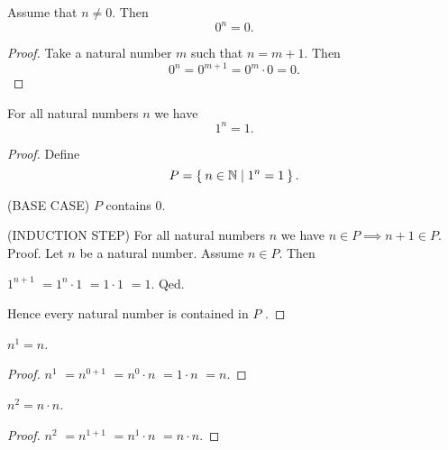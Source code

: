 \documentclass[../../arithmetic.ftl.tex]{subfiles}
\begin{document}
  \begin{forthel}
    \begin{proposition}\label{Arithmetic_01_04_876526}
      Assume that $n \neq 0$.
      Then \[ 0^{n} = 0. \]
    \end{proposition}
    \begin{proof}
      Take a natural number $m$ such that $n = m + 1$.
      Then
      \[
          0^{n}
        = 0^{m + 1}       %
        = 0^{m} \cdot 0   %
        = 0.              %
      \]
    \end{proof}


    \begin{proposition}\label{Arithmetic_01_04_577060}
      For all natural numbers $n$ we have \[ 1^{n} = 1. \]
    \end{proposition}
    \begin{proof}
      Define \[ P = \Set{n \in \mathbb{N} | 1^{n} = 1}. \]

      (BASE CASE) $P$ contains $0$.

      (INDUCTION STEP) For all natural numbers $n$ we have $n \in P \implies n + 1 \in P$. \\
      Proof.
        Let $n$ be a natural number.
        Assume $n \in P$.
        Then

        $  1^{n + 1}$
        $= 1^{n} \cdot 1$   %
        $= 1 \cdot 1$       %
        $= 1$.              %
      Qed.

      Hence every natural number is contained in $P$ .
    \end{proof}


    \begin{proposition}\label{Arithmetic_01_04_848167}
      $n^{1} = n$.
    \end{proposition}
    \begin{proof}
      $  n^{1}$
      $= n^{0 + 1}$       %
      $= n^{0} \cdot n$   %
      $= 1 \cdot n$       %
      $= n$.              %
    \end{proof}


    \begin{proposition}\label{Arithmetic_01_04_846549}
      $n^{2} = n \cdot n$.
    \end{proposition}
    \begin{proof}
      $  n^{2}$
      $= n^{1 + 1}$       %
      $= n^{1} \cdot n$   %
      $= n \cdot n$.      %
    \end{proof}
  \end{forthel}
\end{document}
